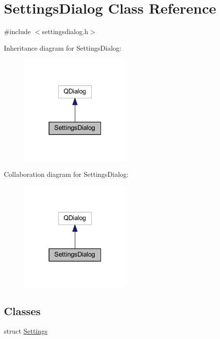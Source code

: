 \hypertarget{class_settings_dialog}{}\section{Settings\+Dialog Class Reference}
\label{class_settings_dialog}


{\ttfamily \#include $<$settingsdialog.\+h$>$}



Inheritance diagram for Settings\+Dialog\+:
\nopagebreak
\begin{figure}[H]
\begin{center}
\leavevmode
\includegraphics[width=160pt]{class_settings_dialog__inherit__graph}
\end{center}
\end{figure}


Collaboration diagram for Settings\+Dialog\+:
\nopagebreak
\begin{figure}[H]
\begin{center}
\leavevmode
\includegraphics[width=160pt]{class_settings_dialog__coll__graph}
\end{center}
\end{figure}
\subsection*{Classes}
\begin{DoxyCompactItemize}
\item 
struct \hyperlink{struct_settings_dialog_1_1_settings}{Settings}
\end{DoxyCompactItemize}
